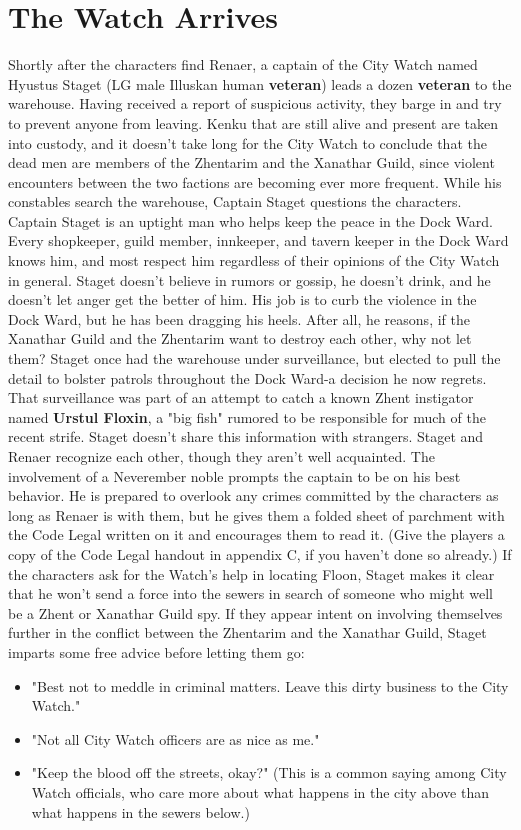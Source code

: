 \documentclass[10pt,a4paper,twoside,twocolumn,openany,nodeprecatedcode]{dndbook}
\begin{document}
\section{The Watch Arrives}
Shortly after the characters find Renaer, a captain of the City Watch named Hyustus Staget (LG male Illuskan human \textbf{veteran}) leads a dozen \textbf{veteran} to the warehouse. Having received a report of suspicious activity, they barge in and try to prevent anyone from leaving. Kenku that are still alive and present are taken into custody, and it doesn't take long for the City Watch to conclude that the dead men are members of the Zhentarim and the Xanathar Guild, since violent encounters between the two factions are becoming ever more frequent. While his constables search the warehouse, Captain Staget questions the characters.
Captain Staget is an uptight man who helps keep the peace in the Dock Ward. Every shopkeeper, guild member, innkeeper, and tavern keeper in the Dock Ward knows him, and most respect him regardless of their opinions of the City Watch in general. Staget doesn't believe in rumors or gossip, he doesn't drink, and he doesn't let anger get the better of him. His job is to curb the violence in the Dock Ward, but he has been dragging his heels. After all, he reasons, if the Xanathar Guild and the Zhentarim want to destroy each other, why not let them?
Staget once had the warehouse under surveillance, but elected to pull the detail to bolster patrols throughout the Dock Ward-a decision he now regrets. That surveillance was part of an attempt to catch a known Zhent instigator named \textbf{Urstul Floxin}, a "big fish" rumored to be responsible for much of the recent strife. Staget doesn't share this information with strangers.
Staget and Renaer recognize each other, though they aren't well acquainted. The involvement of a Neverember noble prompts the captain to be on his best behavior. He is prepared to overlook any crimes committed by the characters as long as Renaer is with them, but he gives them a folded sheet of parchment with the Code Legal written on it and encourages them to read it. (Give the players a copy of the Code Legal handout in appendix C, if you haven't done so already.)
If the characters ask for the Watch's help in locating Floon, Staget makes it clear that he won't send a force into the sewers in search of someone who might well be a Zhent or Xanathar Guild spy. If they appear intent on involving themselves further in the conflict between the Zhentarim and the Xanathar Guild, Staget imparts some free advice before letting them go:
\begin{itemize}

\item "Best not to meddle in criminal matters. Leave this dirty business to the City Watch."
\item "Not all City Watch officers are as nice as me."
\item "Keep the blood off the streets, okay?" (This is a common saying among City Watch officials, who care more about what happens in the city above than what happens in the sewers below.)
\end{itemize}
\end{document}
